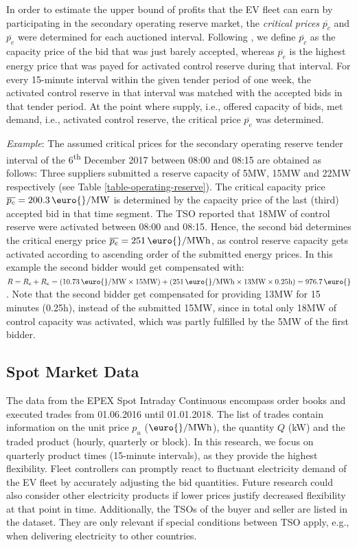\documentclass[a4paper, 12pt]{article}
\let\textcite\shortciteA
\begin{document}
In order to estimate the upper bound of profits that the EV fleet can earn by
participating in the secondary operating reserve market, the \emph{critical prices}
\(\overline{p_c}\) and \(\overline{p_e}\) were determined for each auctioned
interval. Following \textcite{brandt17_evaluat_busin_model_vehic_grid_integ}, we
define \(\overline{p_c}\) as the capacity price of the bid that was just barely
accepted, whereas \(\overline{p_e}\) is the highest energy price that was payed
for activated control reserve during that interval. For every
15-minute interval within the given tender period of one week, the activated
control reserve in that interval was matched with the accepted bids in that
tender period. At the point where supply, i.e., offered capacity of bids, met
demand, i.e., activated control reserve, the critical price \(\overline{p_e}\) was
determined.

\emph{Example}: The assumed critical prices for the secondary operating reserve
tender interval of the 6\textsuperscript{th} December 2017 between 08:00 and 08:15 are obtained
as follows: Three suppliers submitted a reserve capacity of 5MW, 15MW and 22MW
respectively (see Table \ref{table-operating-reserve}). The critical capacity
price \(\overline{p_c} = 200.3 \text{ \!\euro{}/MW}\) is determined by the
capacity price of the last (third) accepted bid in that time segment. The TSO
reported that 18MW of control reserve were activated between 08:00 and 08:15.
Hence, the second bid determines the critical energy price \(\overline{p_e} = 251
\text{ \!\euro{}/MWh}\), as control reserve capacity gets activated according to
ascending order of the submitted energy prices. In this example the second
bidder would get compensated with: \(R = R_c + R_e =(10.73
\text{ \!\euro{}/MW}\times15\text{MW}) + (251
\text{ \!\euro{}/MWh}\times13\text{MW}\times 0.25\text{h}) =
976.7\text{ \!\euro{}}\). Note that the second bidder get compensated for
providing 13MW for 15 minutes (0.25h), instead of the submitted 15MW, since in
total only 18MW of control capacity was activated, which was partly fulfilled
by the 5MW of the first bidder.

\subsection{Spot Market Data}
\label{sec:org15f15c3}
The data from the EPEX Spot Intraday Continuous encompass order books and
executed trades from 01.06.2016 until 01.01.2018. The list of trades contain
information on the unit price \(p_u\) (\(\text{\euro{}/MWh}\)), the quantity \(Q\)
(kW) and the traded product (hourly, quarterly or block). In this research, we
focus on quarterly product times (15-minute intervals), as they provide the
highest flexibility. Fleet controllers can promptly react to fluctuant
electricity demand of the EV fleet by accurately adjusting the bid quantities.
Future research could also consider other electricity products if lower prices
justify decreased flexibility at that point in time. Additionally, the TSOs of
the buyer and seller are listed in the dataset. They are only relevant if
special conditions between TSO apply, e.g., when delivering electricity to other
countries.
\end{document}
